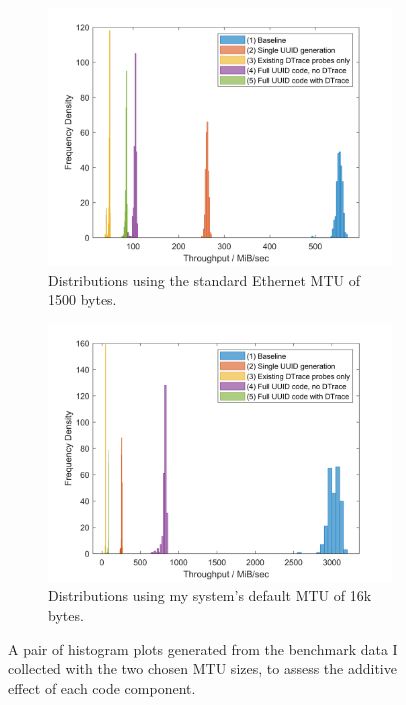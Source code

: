 \documentclass[a4paper,12pt,twoside,openright]{report}
\begin{document}
	\begin{figure}
		\begin{subfigure}{\linewidth}
			\centering
			\includegraphics[width=0.9\linewidth]{include/ipc-mtu1500.png}
			\caption{Distributions using the standard Ethernet MTU of 1500 bytes.}
			\label{fig:ipc-eval-1500}
		\end{subfigure}
		\begin{subfigure}{\linewidth}
			\centering
			\includegraphics[width=0.9\linewidth]{include/ipc-mtu16k.png}
			\caption{Distributions using my system's default MTU of 16k bytes.}
			\label{fig:ipc-eval-16k}
		\end{subfigure}
		\caption{A pair of histogram plots generated from the benchmark data I collected with the two chosen MTU sizes, to assess the additive effect of each code component.}
		\label{fig:ipc-eval}
	\end{figure}
\end{document}
